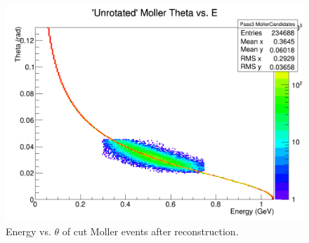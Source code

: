 \documentclass{article}
\begin{document}
	\begin{figure}[H]
  	\includegraphics[width=\linewidth]{PostCollabMeet/Pass3Data/Full5772/CUT_Unrotmoller_ThetaE.png}
  	\caption{Energy vs. $\theta$ of cut Moller events after reconstruction.}
  	\label{fig:cutDataET}
	\end{figure}
\end{document}
